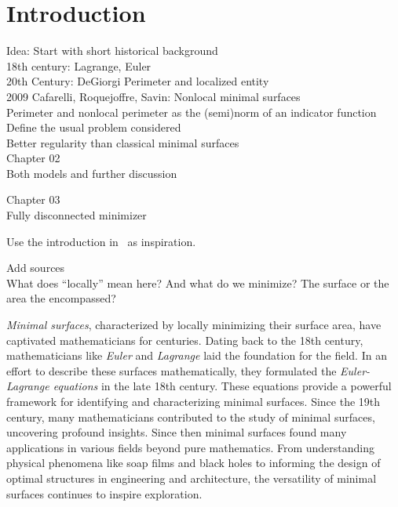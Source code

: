 \chapter{Introduction}
\label{ch:introduction}

Idea: Start with short historical background\\
18th century: Lagrange, Euler\\
20th Century: DeGiorgi Perimeter and localized entity\\
2009 Cafarelli, Roquejoffre, Savin: Nonlocal minimal surfaces\\
Perimeter and nonlocal perimeter as the (semi)norm of an indicator function\\
Define the usual problem considered\\
Better regularity than classical minimal surfaces\\

Chapter 02\\
Both models and further discussion

Chapter 03\\
Fully disconnected minimizer


Use the introduction in~\cite{dipierro2012asymptotics} as inspiration.

\begin{TODO}
	Add sources \\
	What does \enquote{locally} mean here? And what do we minimize? The surface or the
	area the encompassed?
\end{TODO}


\emph{Minimal surfaces}, characterized by locally minimizing their surface area, have
captivated mathematicians for centuries. Dating back to the 18th century, mathematicians
like \emph{Euler} and \emph{Lagrange} laid the foundation for the field. In an effort to
describe these surfaces mathematically, they formulated the \emph{Euler-Lagrange
	equations} in the late 18th century. These equations provide a powerful framework for
identifying and characterizing minimal surfaces. Since the 19th century, many
mathematicians contributed to the study of minimal surfaces, uncovering profound insights.
Since then minimal surfaces found many applications in various fields beyond pure
mathematics. From understanding physical phenomena like soap films and black holes to
informing the design of optimal structures in engineering and architecture, the
versatility of minimal surfaces continues to inspire exploration.\newline

